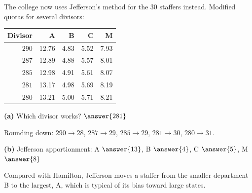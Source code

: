 \documentclass[12pt]{ximera}
\begin{document}
\begin{problem}
The college now uses Jefferson's method for the $30$ staffers instead. Modified quotas for
several divisors:
\begin{center}
\begin{tabular}{r|rrrr}
Divisor & A & B & C & M\\\hline
$290$ & 12.76 & 4.83 & 5.52 & 7.93\\
$287$ & 12.89 & 4.88 & 5.57 & 8.01\\
$285$ & 12.98 & 4.91 & 5.61 & 8.07\\
$281$ & 13.17 & 4.98 & 5.69 & 8.19\\
$280$ & 13.21 & 5.00 & 5.71 & 8.21
\end{tabular}
\end{center}

\begin{prompt}
\textbf{(a)} Which divisor works? $\answer{281}$
\begin{feedback}
Rounding down: $290\to28$, $287\to29$, $285\to29$, $281\to30$, $280\to31$.
\end{feedback}
\end{prompt}

\begin{prompt}
\textbf{(b)} Jefferson apportionment: A $\answer{13}$, B $\answer{4}$, C $\answer{5}$,
M $\answer{8}$
\begin{feedback}
Compared with Hamilton, Jefferson moves a staffer from the smaller department B to the
largest, A, which is typical of its bias toward large states.
\end{feedback}
\end{prompt}
\end{problem}
\end{document}
